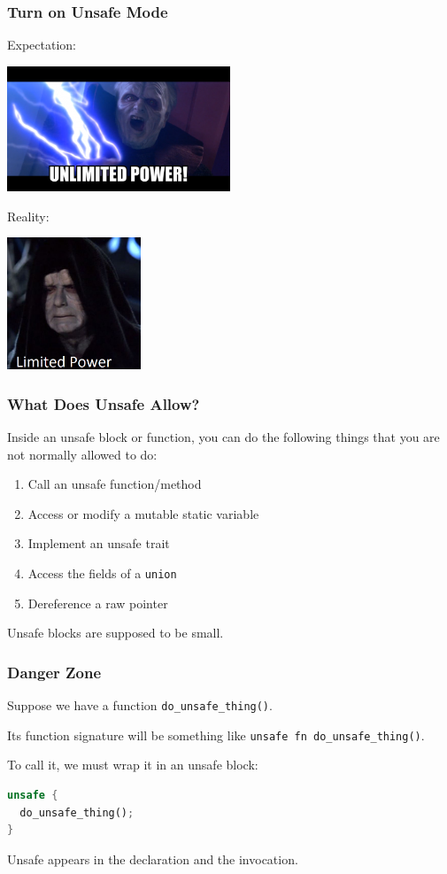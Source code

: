\begin{frame}
\frametitle{Turn on Unsafe Mode}

Expectation:
\begin{center}
	\includegraphics[width=0.5\textwidth]{images/unlimitedpower.png}
\end{center}

Reality:
\begin{center}
	\includegraphics[width=0.3\textwidth]{images/limitedpower.jpg}
\end{center}

\end{frame}



\begin{frame}
\frametitle{What Does Unsafe Allow?}

Inside an unsafe block or function, you can do the following things that you are not normally allowed to do:

\begin{enumerate}
	\item Call an unsafe function/method
	\item Access or modify a mutable static variable
	\item Implement an unsafe trait
	\item Access the fields of a \texttt{union}
	\item Dereference a raw pointer
\end{enumerate}

Unsafe blocks are supposed to be small. 

\end{frame}


\begin{frame}[fragile]
\frametitle{Danger Zone}

Suppose we have a function \texttt{do\_unsafe\_thing()}.

Its function signature will be something like \texttt{unsafe fn do\_unsafe\_thing()}.

To call it, we must wrap it in an unsafe block:

\begin{lstlisting}[language=Rust]
unsafe {
  do_unsafe_thing();
}
\end{lstlisting}

Unsafe appears in the declaration and the invocation.

\end{frame}


